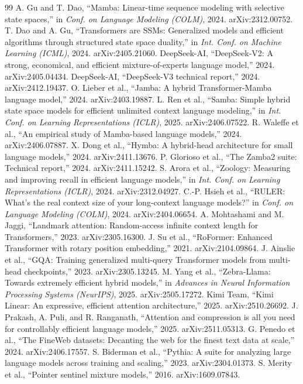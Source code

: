 \documentclass[conference]{IEEEtran}
\begin{document}
\balance
\begin{thebibliography}{99}
 A. Gu and T. Dao, ``Mamba: Linear-time sequence modeling with selective state spaces,'' in \textit{Conf. on Language Modeling (COLM)}, 2024. arXiv:2312.00752.
 T. Dao and A. Gu, ``Transformers are SSMs: Generalized models and efficient algorithms through structured state space duality,'' in \textit{Int. Conf. on Machine Learning (ICML)}, 2024. arXiv:2405.21060.
 DeepSeek-AI, ``DeepSeek-V2: A strong, economical, and efficient mixture-of-experts language model,'' 2024. arXiv:2405.04434.
 DeepSeek-AI, ``DeepSeek-V3 technical report,'' 2024. arXiv:2412.19437.
 O. Lieber et al., ``Jamba: A hybrid Transformer-Mamba language model,'' 2024. arXiv:2403.19887.
 L. Ren et al., ``Samba: Simple hybrid state space models for efficient unlimited context language modeling,'' in \textit{Int. Conf. on Learning Representations (ICLR)}, 2025. arXiv:2406.07522.
 R. Waleffe et al., ``An empirical study of Mamba-based language models,'' 2024. arXiv:2406.07887.
 X. Dong et al., ``Hymba: A hybrid-head architecture for small language models,'' 2024. arXiv:2411.13676.
 P. Glorioso et al., ``The Zamba2 suite: Technical report,'' 2024. arXiv:2411.15242.
 S. Arora et al., ``Zoology: Measuring and improving recall in efficient language models,'' in \textit{Int. Conf. on Learning Representations (ICLR)}, 2024. arXiv:2312.04927.
 C.-P. Hsieh et al., ``RULER: What's the real context size of your long-context language models?'' in \textit{Conf. on Language Modeling (COLM)}, 2024. arXiv:2404.06654.
 A. Mohtashami and M. Jaggi, ``Landmark attention: Random-access infinite context length for Transformers,'' 2023. arXiv:2305.16300.
 J. Su et al., ``RoFormer: Enhanced Transformer with rotary position embedding,'' 2021. arXiv:2104.09864.
 J. Ainslie et al., ``GQA: Training generalized multi-query Transformer models from multi-head checkpoints,'' 2023. arXiv:2305.13245.
 M. Yang et al., ``Zebra-Llama: Towards extremely efficient hybrid models,'' in \textit{Advances in Neural Information Processing Systems (NeurIPS)}, 2025. arXiv:2505.17272.
 Kimi Team, ``Kimi Linear: An expressive, efficient attention architecture,'' 2025. arXiv:2510.26692.
 J. Prakash, A. Puli, and R. Ranganath, ``Attention and compression is all you need for controllably efficient language models,'' 2025. arXiv:2511.05313.
 G. Penedo et al., ``The FineWeb datasets: Decanting the web for the finest text data at scale,'' 2024. arXiv:2406.17557.
 S. Biderman et al., ``Pythia: A suite for analyzing large language models across training and scaling,'' 2023. arXiv:2304.01373.
 S. Merity et al., ``Pointer sentinel mixture models,'' 2016. arXiv:1609.07843.
\end{thebibliography}
\end{document}
